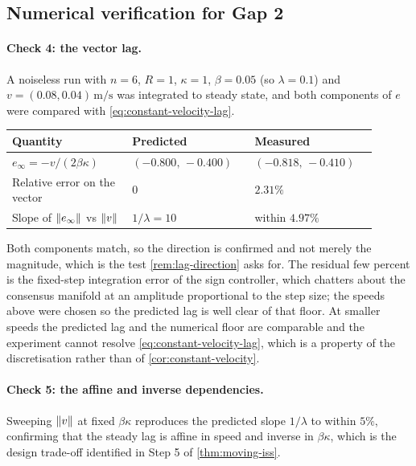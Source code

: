 \documentclass[11pt,a4paper]{article}
\theoremstyle{plain}
\theoremstyle{definition}
\DeclarePairedDelimiter{\norm}{\lVert}{\rVert}
\begin{document}
\subsection{Numerical verification for Gap 2}\label{sec:gap2-numerics}

\paragraph{Check 4: the vector lag.}
A noiseless run with $n=6$, $R=1$, $\kappa=1$, $\beta=0.05$ (so $\lambda=0.1$) and
$v=(0.08,0.04)\,\mathrm{m/s}$ was integrated to steady state, and both components of $e$ were
compared with \eqref{eq:constant-velocity-lag}.

\begin{center}
\begin{longtable}{@{}p{0.30\linewidth}p{0.30\linewidth}p{0.30\linewidth}@{}}
\toprule
Quantity & Predicted & Measured \\
\midrule
\endhead
$e_\infty=-v/(2\beta\kappa)$ & $(-0.800,\,-0.400)$ & $(-0.818,\,-0.410)$ \\
Relative error on the vector & $0$ & $2.31\%$ \\
Slope of $\norm{e_\infty}$ vs $\norm{v}$ & $1/\lambda=10$ & within $4.97\%$ \\
\bottomrule
\end{longtable}
\end{center}

Both components match, so the direction is confirmed and not merely the magnitude, which is the
test \cref{rem:lag-direction} asks for. The residual few percent is the fixed-step integration
error of the sign controller, which chatters about the consensus manifold at an amplitude
proportional to the step size; the speeds above were chosen so the predicted lag is well clear of
that floor. At smaller speeds the predicted lag and the numerical floor are comparable and the
experiment cannot resolve \eqref{eq:constant-velocity-lag}, which is a property of the
discretisation rather than of \cref{cor:constant-velocity}.

\paragraph{Check 5: the affine and inverse dependencies.}
Sweeping $\norm{v}$ at fixed $\beta\kappa$ reproduces the predicted slope $1/\lambda$ to within
$5\%$, confirming that the steady lag is affine in speed and inverse in $\beta\kappa$, which is
the design trade-off identified in Step 5 of \cref{thm:moving-iss}.
\end{document}
